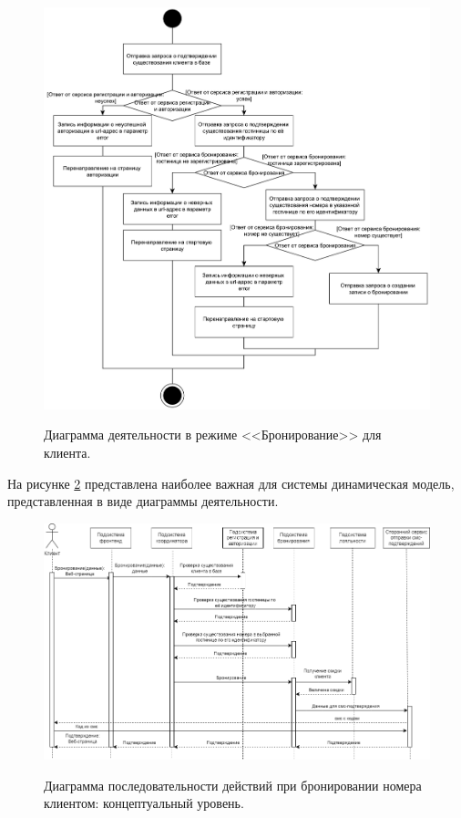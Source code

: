\begin{figure}[h!]
	\begin{center}
		{\includegraphics[scale = 0.58]{img/schemas/schema-1.pdf}}
		\caption{Диаграмма деятельности в режиме <<Бронирование>> для клиента.}
		\label{fig:schema-reservation}
	\end{center}
\end{figure}

\pagebreak

На рисунке \ref{fig:flow-level1} представлена наиболее важная для системы динамическая модель, представленная в виде диаграммы деятельности.

\begin{figure}[h!]
	\begin{center}
		{\includegraphics[angle = 90, scale = 0.63]{img/flow/diag_general.png}}
		\caption{Диаграмма последовательности действий при бронировании номера клиентом: концептуальный уровень.}
		\label{fig:flow-level1}
	\end{center}
\end{figure}


